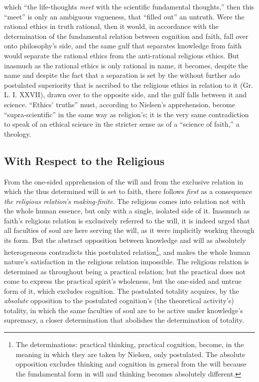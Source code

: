 \documentclass[12pt,a4paper]{book}
\begin{document}
which ``the life-thoughts \emph{meet} with the scientific fundamental thoughts,'' then this ``meet'' is only an
ambiguous vagueness, that ``filled out'' an untruth. Were the rational ethics in truth rational, then it would,
in accordance with the determination of the fundamental relation between cognition and faith, fall over onto
philosophy's side, and the same gulf that separates knowledge from faith would separate the rational ethics
from the anti-rational religious ethics. But inasmuch as the rational ethics is only rational in name, it
becomes, despite the name and despite the fact that a separation is set by the without further ado postulated
superiority that is ascribed to the religious ethics in relation to it (Gr. L. I. XXVII), drawn over to the
opposite side, and the gulf falls between it and science. ``Ethics' truths'' must, according to Nielsen's
apprehension, become ``supra-scientific'' in the same way as religion's; it is the very same contradiction to
speak of an ethical science in the stricter sense as of a ``science of faith,'' a theology.

\subsection{With Respect to the Religious}
\label{ssec:conseq-religious}

From the one-sided apprehension of the will and from the exclusive relation in which the thus
determined will is set to faith, there follows \emph{first} as a consequence \emph{the religious
relation's making-finite}. The religious comes into relation not with the whole human essence,
but only with a single, isolated side of it. Inasmuch as faith's religious relation is exclusively
referred to the will, it is indeed urged that all faculties of soul are here serving the will, as
it were implicitly working through its form. But the abstract opposition between knowledge and will
as absolutely heterogeneous contradicts this postulated relation\footnote{The determinations:
practical thinking, practical cognition, become, in the meaning in which they are taken by Nielsen,
only postulated. The absolute opposition excludes thinking and cognition in general from the will
because the fundamental form in will and thinking becomes absolutely different.}, and makes the whole
human nature's satisfaction in the religious relation impossible. The religious relation is determined
as throughout being a practical relation; but the practical does not come to express the practical
spirit's wholeness, but the one-sided and untrue form of it, which excludes cognition. The postulated
totality acquires, by the \emph{absolute} opposition to the postulated cognition's (the theoretical
activity's) totality, in which the same faculties of soul are to be active under knowledge's supremacy,
a closer determination that abolishes the determination of totality.
\end{document}
